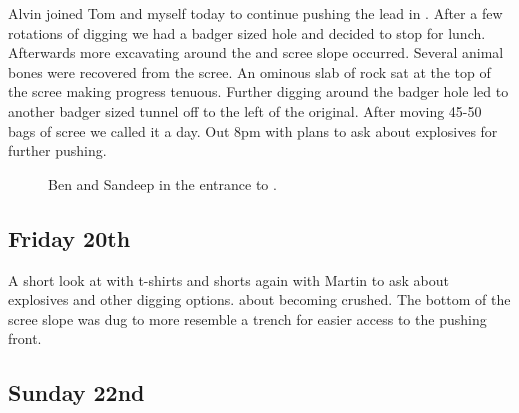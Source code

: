 Alvin joined Tom and myself today to continue pushing the lead in . After a few rotations of digging we had a badger sized hole and
decided to stop for lunch. Afterwards more excavating around the  and scree slope occurred. Several animal bones were recovered from
the scree. An ominous slab of rock sat at the top of the scree making
progress tenuous. Further digging around the badger hole led to another
badger sized tunnel off to the left of the original. After moving 45-50
bags of scree we called it a day. Out 8pm with plans to ask about
explosives for further pushing.

\begin{figure}[t!]
\checkoddpage \ifoddpage \forcerectofloat \else \forceversofloat \fi
{}
\caption{Ben and Sandeep in the entrance to \protect{}. }
\end{figure}

\subsection{Friday 20th}

A short look at  with t-shirts and shorts again with Martin to ask
about explosives and other digging options.  about becoming crushed. The
bottom of the scree slope was dug to more resemble a trench for easier
access to the pushing front.

\subsection{Sunday 22nd}

